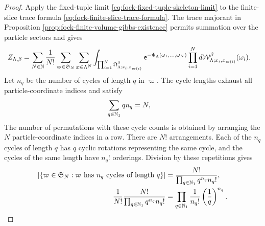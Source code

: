 \documentclass[11pt,a4paper]{article}
\theoremstyle{plain}
\theoremstyle{definition}
\theoremstyle{remark}
\begin{document}
\begin{proof}
Apply the fixed-tuple limit \eqref{eq:fock-fixed-tuple-skeleton-limit} to the finite-slice trace formula
\eqref{eq:fock-finite-slice-trace-formula}.
The trace majorant in Proposition \ref{prop:fock-finite-volume-gibbs-existence} permits summation over the
particle sectors and gives
\begin{equation}
\begin{aligned}
Z_{\Lambda,\beta}
& =
\sum_{N \in \monnat}\frac{1}{N!}
\sum_{\varpi \in \grsym{N}}
\sum_{\boldsymbol{x} \in \Lambda^N}
\int_{\prod_{i = 1}^{N}\Omega_{\Lambda;x_i,x_{\fun{\varpi}{i}}}^{\beta}}
\napiernum^{-\fun{\Phi_{\Lambda}}{\omega_1,\ldots,\omega_N}}
\prod_{i = 1}^{N}
\opdmsr{\msrcal{W}_{\Lambda;x_i,x_{\fun{\varpi}{i}}}^{\beta}}(\omega_i).
\end{aligned}
\label{eq:fock-precycle-partition-function}
\end{equation}
Let $n_q$ be the number of cycles of length $q$ in $\varpi$.
The cycle lengths exhaust all particle-coordinate indices and satisfy
\begin{equation}
\begin{aligned}
\sum_{q \in \mathbb{N}_1}q n_q
& =
N,
\end{aligned}
\label{eq:fock-bosonic-cycle-length-constraint}
\end{equation}
The number of permutations with these cycle counts is obtained by arranging the $N$ particle-coordinate indices
in a row.
There are $N!$ arrangements.
Each of the $n_q$ cycles of length $q$ has $q$ cyclic rotations representing the same cycle, and the cycles
of the same length have $n_q!$ orderings.
Division by these repetitions gives
\begin{equation}
\begin{aligned}
\abscard{\setone{\varpi \in \grsym{N}:\varpi\text{ has $n_q$ cycles of length $q$}}}
& =
\frac{N!}{\prod_{q \in \semigrposint}q^{n_q} n_q!},
\\
\frac{1}{N!}
\frac{N!}{\prod_{q \in \semigrposint}q^{n_q} n_q!}
& =
\prod_{q \in \semigrposint}
\frac{1}{n_q!}\rbk{\frac{1}{q}}^{n_q}.
\end{aligned}
\label{eq:fock-bosonic-cycle-count}
\end{equation}


\end{proof}
\end{document}
